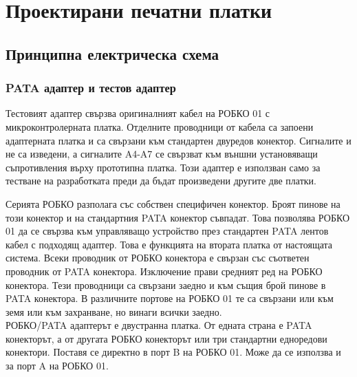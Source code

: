 \chapter{Проектирани печатни платки}
\label{boards_chapter}
\section{Принципна електрическа схема}
\subsection{PATA адаптер и тестов адаптер}
Тестовият адаптер свързва оригиналният кабел на РОБКО 01 с микроконтролерната платка. Отделните проводници от кабела са запоени адаптерната платка и са свързани към стандартен двуредов конектор. Сигналите  и  не са изведени, а сигналите A4-A7 се свързват към външни установяващи съпротивления върху прототипна платка. Този адаптер е използван само за тестване на разработката преди да бъдат произведени другите две платки.

Серията РОБКО разполага със собствен специфичен конектор. Броят пинове на този конектор и на стандартния PATA конектор съвпадат. Това позволява РОБКО 01 да се свързва към управляващо устройство през стандартен PATA лентов кабел с подходящ адаптер. Това е функцията на втората платка от настоящата система. Всеки проводник от РОБКО конектора е свързан със съответен проводник от PATA конектора. Изключение прави средният ред на РОБКО конектора. Тези проводници са свързани заедно и към същия брой пинове в PATA конектора. В различните портове на РОБКО 01 те са свързани или към земя или към захранване, но винаги всички заедно.\\
\indent{}
РОБКО/PATA адаптерът е двустранна платка. От едната страна е PATA конекторът, а от другата РОБКО конекторът или три стандартни едноредови конектори. Поставя се директно в порт B на РОБКО 01. Може да се използва и за порт A на РОБКО 01.

